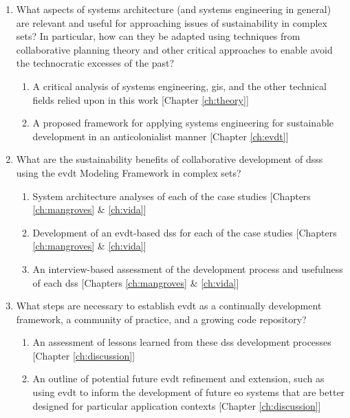 \begin{enumerate}[itemsep=0pt,parsep=0pt]
	\item{What aspects of systems architecture (and systems engineering in general) are relevant and useful for approaching issues of sustainability in complex \ac{sets}? In particular, how can they be adapted using techniques from collaborative planning theory and other critical approaches to enable avoid the technocratic excesses of the past?}
	\begin{enumerate}[label=\emph{\alph*}),itemsep=0pt,parsep=0pt]
		\item{A critical analysis of systems engineering, \ac{gis}, and the other technical fields relied upon in this work [Chapter \ref{ch:theory}] }
		\item{A proposed framework for applying systems engineering for sustainable development in an anticolonialist manner} [Chapter \ref{ch:evdt}]
	\end{enumerate}
	\item{What are the sustainability benefits of collaborative development of \acp{dss} using the \ac{evdt} Modeling Framework in complex \ac{sets}?}
	\begin{enumerate}[label=\emph{\alph*}),itemsep=0pt,parsep=0pt]
		\item{System architecture analyses of each of the case studies [Chapters \ref{ch:mangroves} \& \ref{ch:vida}]} 
		\item{Development of an \ac{evdt}-based \ac{dss} for each of the case studies [Chapters \ref{ch:mangroves} \& \ref{ch:vida}]} 
		\item{An interview-based assessment of the development process and usefulness of each \ac{dss} [Chapters \ref{ch:mangroves} \& \ref{ch:vida}]} 
	\end{enumerate}
	\item{What steps are necessary to establish \ac{evdt} as a continually development framework, a community of practice, and a growing code repository?}
	\begin{enumerate}[label=\emph{\alph*}),itemsep=0pt,parsep=0pt]
		\item{An assessment of lessons learned from these \ac{dss} development processes [Chapter \ref{ch:discussion}]} 
		\item{An outline of potential future \ac{evdt} refinement and extension, such as using \ac{evdt} to inform the development of future \ac{eo} systems that are better designed for particular application contexts [Chapter \ref{ch:discussion}]}
	\end{enumerate}
\end{enumerate}

